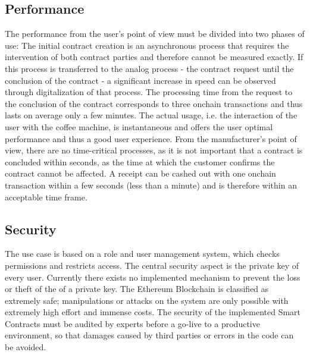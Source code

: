 \documentclass[conference]{IEEEtran}
\begin{document}
\subsection{Performance}
The performance from the user's point of view must be divided into two phases of use: The initial contract creation is an asynchronous process that requires the intervention of both contract parties and therefore cannot be measured exactly. If this process is transferred to the analog process - the contract request until the conclusion of the contract - a significant increase in speed can be observed through digitalization of that process. The processing time from the request to the conclusion of the contract corresponds to three onchain transactions and thus lasts on average only a few minutes. The actual usage, i.e. the interaction of the user with the coffee machine, is instantaneous and offers the user optimal performance and thus a good user experience. From the manufacturer's point of view, there are no time-critical processes, as it is not important that a contract is concluded within seconds, as the time at which the customer confirms the contract cannot be affected. A receipt can be cashed out with one onchain transaction within a few seconds (less than a minute) and is therefore within an acceptable time frame. 

\subsection{Security}
The use case is based on a role and user management system, which checks permissions and restricts access. The central security aspect is the private key of every user. Currently there exists no implemented mechanism to prevent the loss or theft of the of a private key. The Ethereum Blockchain is classified as extremely safe; manipulations or attacks on the system are only possible with extremely high effort and immense costs. The security of the implemented Smart Contracts must be audited by experts before a go-live to a productive environment, so that damages caused by third parties or errors in the code can be avoided.
\end{document}
